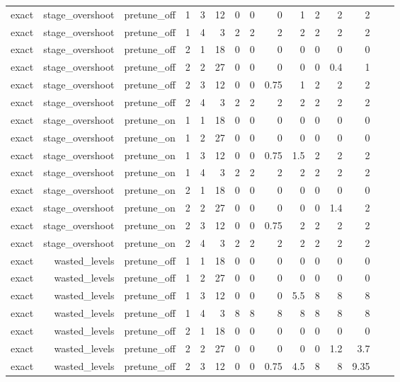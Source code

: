 \begin{table}[htbp]
\begin{tabular}{lrrrrrrrrrrrrrr}
exact & stage\_overshoot & pretune\_off & 1 & 3 & 12 & 0 & 0 & 0 & 1 & 2 & 2 & 2 &  &  \\
exact & stage\_overshoot & pretune\_off & 1 & 4 & 3 & 2 & 2 & 2 & 2 & 2 & 2 & 2 &  &  \\
exact & stage\_overshoot & pretune\_off & 2 & 1 & 18 & 0 & 0 & 0 & 0 & 0 & 0 & 0 &  &  \\
exact & stage\_overshoot & pretune\_off & 2 & 2 & 27 & 0 & 0 & 0 & 0 & 0 & 0.4 & 1 &  &  \\
exact & stage\_overshoot & pretune\_off & 2 & 3 & 12 & 0 & 0 & 0.75 & 1 & 2 & 2 & 2 &  &  \\
exact & stage\_overshoot & pretune\_off & 2 & 4 & 3 & 2 & 2 & 2 & 2 & 2 & 2 & 2 &  &  \\
exact & stage\_overshoot & pretune\_on & 1 & 1 & 18 & 0 & 0 & 0 & 0 & 0 & 0 & 0 &  &  \\
exact & stage\_overshoot & pretune\_on & 1 & 2 & 27 & 0 & 0 & 0 & 0 & 0 & 0 & 0 &  &  \\
exact & stage\_overshoot & pretune\_on & 1 & 3 & 12 & 0 & 0 & 0.75 & 1.5 & 2 & 2 & 2 &  &  \\
exact & stage\_overshoot & pretune\_on & 1 & 4 & 3 & 2 & 2 & 2 & 2 & 2 & 2 & 2 &  &  \\
exact & stage\_overshoot & pretune\_on & 2 & 1 & 18 & 0 & 0 & 0 & 0 & 0 & 0 & 0 &  &  \\
exact & stage\_overshoot & pretune\_on & 2 & 2 & 27 & 0 & 0 & 0 & 0 & 0 & 1.4 & 2 &  &  \\
exact & stage\_overshoot & pretune\_on & 2 & 3 & 12 & 0 & 0 & 0.75 & 2 & 2 & 2 & 2 &  &  \\
exact & stage\_overshoot & pretune\_on & 2 & 4 & 3 & 2 & 2 & 2 & 2 & 2 & 2 & 2 &  &  \\
exact & wasted\_levels & pretune\_off & 1 & 1 & 18 & 0 & 0 & 0 & 0 & 0 & 0 & 0 &  &  \\
exact & wasted\_levels & pretune\_off & 1 & 2 & 27 & 0 & 0 & 0 & 0 & 0 & 0 & 0 &  &  \\
exact & wasted\_levels & pretune\_off & 1 & 3 & 12 & 0 & 0 & 0 & 5.5 & 8 & 8 & 8 &  &  \\
exact & wasted\_levels & pretune\_off & 1 & 4 & 3 & 8 & 8 & 8 & 8 & 8 & 8 & 8 &  &  \\
exact & wasted\_levels & pretune\_off & 2 & 1 & 18 & 0 & 0 & 0 & 0 & 0 & 0 & 0 &  &  \\
exact & wasted\_levels & pretune\_off & 2 & 2 & 27 & 0 & 0 & 0 & 0 & 0 & 1.2 & 3.7 &  &  \\
exact & wasted\_levels & pretune\_off & 2 & 3 & 12 & 0 & 0 & 0.75 & 4.5 & 8 & 8 & 9.35 &  &  \\

\end{tabular}
\end{table}

